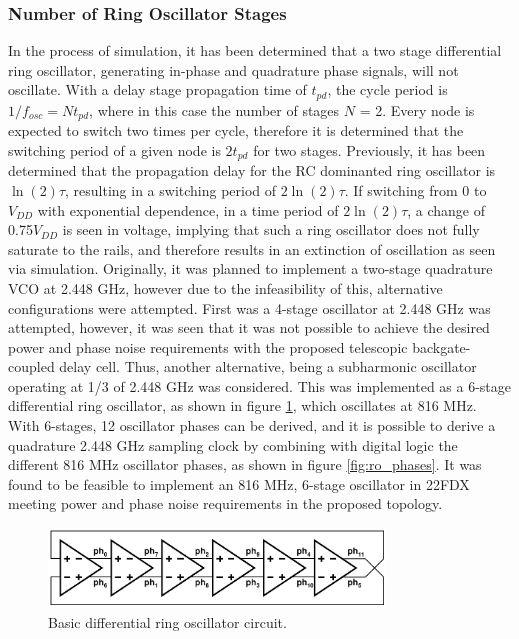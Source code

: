 	\subsubsection{Number of Ring Oscillator Stages}
	In the process of simulation, it has been determined that a two stage differential ring oscillator, generating in-phase and quadrature phase signals, will not oscillate. With a delay stage propagation time of $t_{pd}$, the cycle period is $1/f_{osc} = Nt_{pd}$, where in this case the number of stages $N$ = 2. Every node is expected to switch two times per cycle, therefore it is determined that the switching period of a given node is $2t_{pd}$ for two stages. Previously, it has been determined that the propagation delay for the RC dominanted ring oscillator is $\ln(2)\tau$, resulting in a switching period of $2\ln(2)\tau$. If switching from 0 to $V_{DD}$ with exponential dependence, in a time period of $2\ln(2)\tau$, a change of 0.75$V_{DD}$ is seen in voltage, implying that such a ring oscillator does not fully saturate to the rails, and therefore results in an extinction of oscillation as seen via simulation. Originally, it was planned to implement a two-stage quadrature VCO at 2.448 GHz, however due to the infeasibility of this, alternative configurations were attempted. First was a 4-stage oscillator at 2.448 GHz was attempted, however, it was seen that it was not possible to achieve the desired power and phase noise requirements with the proposed telescopic backgate-coupled delay cell. Thus, another alternative, being a subharmonic oscillator operating at 1/3 of 2.448 GHz was considered. This was implemented as a 6-stage differential ring oscillator, as shown in figure \ref{fig:basic_6stg_ro}, which oscillates at 816 MHz. With 6-stages, 12 oscillator phases can be derived, and it is possible to derive a quadrature 2.448 GHz sampling clock by combining with digital logic the different 816 MHz oscillator phases, as shown in figure \ref{fig:ro_phases}. It was found to be feasible to implement an 816 MHz, 6-stage oscillator in 22FDX meeting power and phase noise requirements in the proposed topology.


			\begin{figure}[htb!]
			        \centering
			        \includegraphics[width=0.8\textwidth, angle=0]{./figs/design/ro_6st_simple}
			    \caption{Basic differential ring oscillator circuit.}
			    \label{fig:basic_6stg_ro}
			\end{figure}



